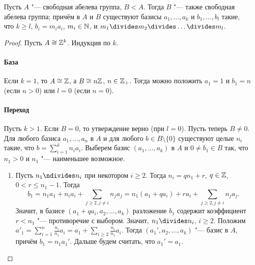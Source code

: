 \documentclass[main]{subfiles}
\begin{document}
\begin{theorem}
  Пусть \( A \) "--- свободная абелева группа, \( B < A \).
  Тогда \( B \) "--- также свободная абелева группа;
  причём в \( A \) и \( B \) существуют базисы
  \( a_1, \dots, a_k \) и \( b_1, \dots, b_l \) такие, что
  \( k \ge l \), \( b_i = m_i a_i \), \( m_i \in \mathbb{N} \),
  и \( m_1 \divides m_2 \divides \dots \divides m_l \).
\end{theorem}
\begin{proof}
  Пусть \( A \cong \mathbb{Z}^k \). Индукция по \( k \).

  \paragraph{База} Если \( k = 1 \), то \( A \cong \mathbb{Z} \), а
  \( B \cong n \mathbb{Z} \), \( n \in \mathbb{Z}_+ \).
  Тогда можно положить \( a_1 = 1 \) и
  \( b_1 = n \) (если \( n > 0 \)) или \( l = 0 \)
  (если \( n = 0 \)).

  \paragraph{Переход} Пусть \( k > 1 \). Если \( B = 0 \),
  то утверждение верно (при \( l = 0 \)). Пусть теперь
  \( B \ne 0 \). Для любого базиса \( a_1, \dots, a_n \) в \( A \)
  и для любого \( b \in B \setminus \{ 0 \} \) существуют целые
  \( n_i \) такие, что \( b = \sum_{i = 1}^k n_i a_i \).
  Выберем базис \( (a_1, \dots, a_k) \) в \( A \) и
  \( 0 \ne b_1 \in B \) так, что \( n_1 > 0 \) и \( n_1 \) "---
  наименьшее возможное.

  \begin{enumerate}
    \item Пусть \( n_1 \ndivides n_i \) при некотором \( i \ge 2 \).
      Тогда \( n_i = qn_1 + r \), \( q \in \mathbb{Z} \),
      \( 0 < r \le n_1 - 1 \). Тогда
      \[
	b_1 = n_1 a_1 + n_i a_i + \sum_{j \ge 2, j \ne i} n_j a_j =
	n_1(a_1 + q a_i) + r a_i + \sum_{j \ge 2, j \ne i} n_j a_j.
      \]
    Значит,  в базисе \( (a_1 + q a_i, a_2, \dots, a_k) \) разложение
      \( b_1 \) содержит коэффициент \( r < n_1 \) "--- противоречие
      с выбором. Значит, \( n_1 \divides n_i \), \( i \ge 2 \).
      Положим \( a'_1 = \sum_{i = 1}^n \frac{n_i}{n_1} a_i =
      a_1 + \sum_{i \ge 2} \frac{n_i}{n_1} a_i \). Тогда
      \( (a_1', a_2, \dots, a_k) \) "--- базис в \( A \), причём
      \( b_1 = n_1 a_1' \).  Дальше будем считать, что \( a_1' = a_1 \).


\end{enumerate}
\end{proof}
\end{document}

